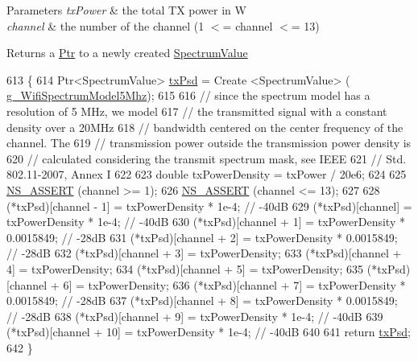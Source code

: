 \begin{DoxyParams}{Parameters}
{\em tx\+Power} & the total TX power in W \\
\hline
{\em channel} & the number of the channel (1 $<$= channel $<$= 13)\\
\hline
\end{DoxyParams}
\begin{DoxyReturn}{Returns}
a \hyperlink{classns3_1_1Ptr}{Ptr} to a newly created \hyperlink{classns3_1_1SpectrumValue}{Spectrum\+Value} 
\end{DoxyReturn}

\begin{DoxyCode}
613 \{
614   Ptr<SpectrumValue> \hyperlink{lte__link__budget_8m_a684fe3101a5e48a5fcc57cab8dbcd1aa}{txPsd} = Create <SpectrumValue> (
      \hyperlink{namespacens3_a333f39e20bd1e6b083d03c143b0be161}{g\_WifiSpectrumModel5Mhz});
615 
616   \textcolor{comment}{// since the spectrum model has a resolution of 5 MHz, we model}
617   \textcolor{comment}{// the transmitted signal with a constant density over a 20MHz}
618   \textcolor{comment}{// bandwidth centered on the center frequency of the channel. The}
619   \textcolor{comment}{// transmission power outside the transmission power density is}
620   \textcolor{comment}{// calculated considering the transmit spectrum mask, see IEEE}
621   \textcolor{comment}{// Std. 802.11-2007, Annex I}
622 
623   \textcolor{keywordtype}{double} txPowerDensity = txPower / 20e6;
624 
625   \hyperlink{assert_8h_a6dccdb0de9b252f60088ce281c49d052}{NS\_ASSERT} (channel >= 1);
626   \hyperlink{assert_8h_a6dccdb0de9b252f60088ce281c49d052}{NS\_ASSERT} (channel <= 13);
627 
628   (*txPsd)[channel - 1] = txPowerDensity * 1e-4;      \textcolor{comment}{// -40dB}
629   (*txPsd)[channel]     = txPowerDensity * 1e-4;      \textcolor{comment}{// -40dB}
630   (*txPsd)[channel + 1] = txPowerDensity * 0.0015849; \textcolor{comment}{// -28dB}
631   (*txPsd)[channel + 2] = txPowerDensity * 0.0015849; \textcolor{comment}{// -28dB}
632   (*txPsd)[channel + 3] = txPowerDensity;
633   (*txPsd)[channel + 4] = txPowerDensity;
634   (*txPsd)[channel + 5] = txPowerDensity;
635   (*txPsd)[channel + 6] = txPowerDensity;
636   (*txPsd)[channel + 7] = txPowerDensity * 0.0015849; \textcolor{comment}{// -28dB}
637   (*txPsd)[channel + 8] = txPowerDensity * 0.0015849; \textcolor{comment}{// -28dB}
638   (*txPsd)[channel + 9] = txPowerDensity * 1e-4;      \textcolor{comment}{// -40dB}
639   (*txPsd)[channel + 10] = txPowerDensity * 1e-4;      \textcolor{comment}{// -40dB}
640 
641   \textcolor{keywordflow}{return} \hyperlink{lte__link__budget_8m_a684fe3101a5e48a5fcc57cab8dbcd1aa}{txPsd};
642 \}
\end{DoxyCode}


